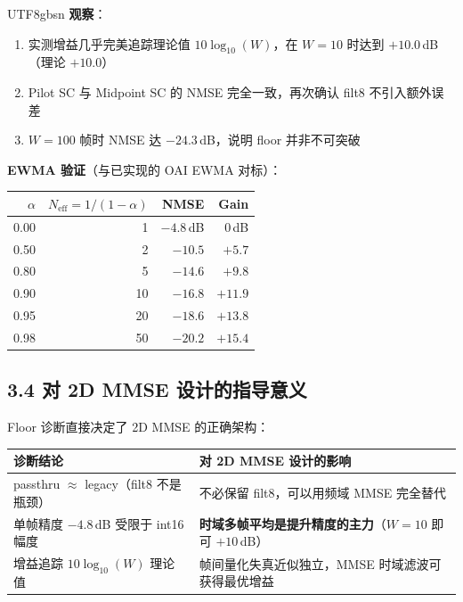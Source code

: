 \documentclass[11pt,a4paper]{article}
\begin{document}
\begin{CJK}{UTF8}{gbsn}
\textbf{观察}：
\begin{enumerate}[leftmargin=2em]
\item 实测增益几乎完美追踪理论值 $10\log_{10}(W)$，在 $W=10$ 时达到 $+10.0$\,dB（理论 $+10.0$）
\item Pilot SC 与 Midpoint SC 的 NMSE 完全一致，再次确认 filt8 不引入额外误差
\item $W=100$ 帧时 NMSE 达 $-24.3$\,dB，说明 floor 并非不可突破
\end{enumerate}

\textbf{EWMA 验证}（与已实现的 OAI EWMA 对标）：

\begin{table}[h]\centering
\begin{tabular}{rrrr}
\toprule
$\alpha$ & $N_{\text{eff}} = 1/(1\!-\!\alpha)$ & NMSE & Gain \\
\midrule
0.00 & 1 & $-4.8$\,dB & 0\,dB \\
0.50 & 2 & $-10.5$ & $+5.7$ \\
0.80 & 5 & $-14.6$ & $+9.8$ \\
0.90 & 10 & $-16.8$ & $+11.9$ \\
0.95 & 20 & $-18.6$ & $+13.8$ \\
0.98 & 50 & $-20.2$ & $+15.4$ \\
\bottomrule
\end{tabular}
\end{table}

\subsection{3.4 对 2D MMSE 设计的指导意义}

Floor 诊断直接决定了 2D MMSE 的正确架构：

\begin{table}[h]\centering
\begin{tabular}{p{5cm}p{8cm}}
\toprule
诊断结论 & 对 2D MMSE 设计的影响 \\
\midrule
passthru $\approx$ legacy（filt8 不是瓶颈） & 不必保留 filt8，可以用频域 MMSE 完全替代 \\
\addlinespace
单帧精度 $-4.8$\,dB 受限于 int16 幅度 & \textbf{时域多帧平均是提升精度的主力}（$W=10$ 即可 $+10$\,dB） \\
\addlinespace
增益追踪 $10\log_{10}(W)$ 理论值 & 帧间量化失真近似独立，MMSE 时域滤波可获得最优增益 \\
\bottomrule
\end{tabular}
\end{table}


\end{CJK}
\end{document}

